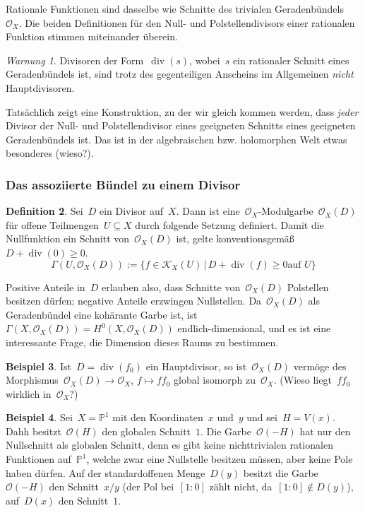 \documentclass[a4paper,ngerman,12pt]{scrartcl}
\theoremstyle{definition}
\newtheorem{defn}{Definition}[section]
\newtheorem{ex}[defn]{Beispiel}
\theoremstyle{plain}
\theoremstyle{remark}
\newtheorem{warning}[defn]{Warnung}
\newcommand{\PP}{\mathbb{P}}
\newcommand{\K}{\mathcal{K}}
\renewcommand{\O}{\mathcal{O}}
\renewcommand{\div}{\operatorname{div}}
\begin{document}
Rationale Funktionen sind dasselbe wie Schnitte des trivialen
Geradenbündels~$\O_X$. Die beiden Definitionen für den Null- und
Polstellendivisors einer rationalen Funktion stimmen miteinander überein.

\begin{warning}Divisoren der Form~$\div(s)$, wobei~$s$ ein rationaler Schnitt
eines Geradenbündels ist, sind trotz des gegenteiligen Anscheins im
Allgemeinen \emph{nicht} Hauptdivisoren.\end{warning}

Tatsächlich zeigt eine Konstruktion, zu der wir gleich kommen werden, dass
\emph{jeder} Divisor der Null- und Polstellendivisor eines geeigneten Schnitts
eines geeigneten Geradenbündels ist. Das ist in der algebraischen bzw.
holomorphen Welt etwas besonderes (wieso?).


\subsubsection*{Das assoziierte Bündel zu einem Divisor}

\begin{defn}Sei~$D$ ein Divisor auf~$X$. Dann ist
eine~$\O_X$-Modulgarbe~$\O_X(D)$ für offene Teilmengen~$U \subseteq X$ durch
folgende Setzung definiert. Damit die Nullfunktion ein Schnitt von~$\O_X(D)$
ist, gelte konventionsgemäß~$D + \div(0) \geq 0$.
\[ \Gamma(U, \O_X(D)) := \{ f \in \K_X(U) \,|\, \text{$D + \div(f) \geq 0$
auf~$U$} \} \]
\end{defn}

Positive Anteile in~$D$ erlauben also, dass Schnitte von~$\O_X(D)$ Polstellen
besitzen dürfen; negative Anteile erzwingen Nullstellen. Da~$\O_X(D)$ als
Geradenbündel eine kohärante Garbe ist, ist~$\Gamma(X,\O_X(D)) =
H^0(X,\O_X(D))$ endlich-dimensional, und es ist eine interessante Frage, die
Dimension dieses Raums zu bestimmen.

\begin{ex}\label{ex:o-hauptdivisor}
Ist~$D = \div(f_0)$ ein Hauptdivisor, so ist~$\O_X(D)$ vermöge des
Morphismus~$\O_X(D) \to \O_X$, $f \mapsto f f_0$ global isomorph zu~$\O_X$.
(Wieso liegt~$f f_0$ wirklich in~$\O_X$?)\end{ex}

\begin{ex}Sei~$X = \PP^1$ mit den Koordinaten~$x$ und~$y$ und sei~$H = V(x)$.
Dahh besitzt~$\O(H)$ den globalen Schnitt~$1$. Die Garbe~$\O(-H)$ hat nur den
Nullschnitt als globalen Schnitt, denn es gibt keine nichttrivialen rationalen
Funktionen auf~$\PP^1$, welche zwar eine Nullstelle besitzen müssen, aber keine
Pole haben dürfen. Auf der standardoffenen Menge~$D(y)$ besitzt die Garbe~$\O(-H)$
den Schnitt~$x/y$ (der Pol bei~$[1:0]$ zählt nicht, da~$[1:0] \not\in D(y)$),
auf~$D(x)$ den Schnitt~$1$.
\end{ex}
\end{document}
